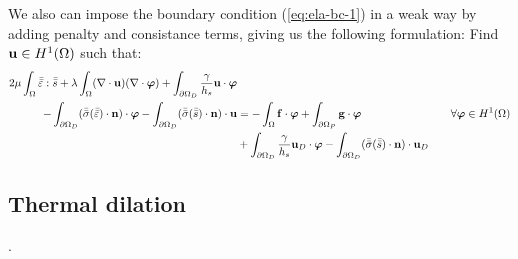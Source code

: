 We also can impose the boundary condition (\ref{eq:ela-bc-1}) in a weak way by
adding penalty and consistance terms, giving us the following formulation:
Find $\mathbf{u}\in H^1(\Omega)$ such that:
\begin{alignat}{2}
  2\mu \int_\Omega \bar{\bar{\varepsilon}}:\bar{\bar{s}}
  + \lambda \int_\Omega (\nabla\cdot\mathbf{u})(\nabla\cdot\bm{\varphi})
  + \int_{\partial \Omega_D} \frac{\gamma}{h_s} \mathbf{u} \cdot \bm{\varphi}
  &&& \nonumber \\
  - \int_{\partial \Omega_D}
  (\bar{\bar{\sigma}}(\bar{\bar{\varepsilon}}) \cdot \mathbf{n}) \cdot \bm{\varphi}
  - \int_{\partial \Omega_D} (\bar{\bar{\sigma}}(\bar{\bar{s}}) \cdot \mathbf{n}) \cdot \mathbf{u}
  &= - \int_\Omega \mathbf{f}\cdot\bm{\varphi}
  + \int_{\partial\Omega_P} \mathbf{g}\cdot\bm{\varphi}
  && \quad \forall \bm{\varphi}\in H^1(\Omega) \label{eq:ela-vf-weak} \\
  & + \int_{\partial \Omega_D} \frac{\gamma}{h_s} \mathbf{u}_D \cdot \bm{\varphi}
  - \int_{\partial \Omega_D} (\bar{\bar{\sigma}}(\bar{\bar{s}}) \cdot \mathbf{n}) \cdot \mathbf{u}_D
  \nonumber
\end{alignat}

\subsection{Thermal dilation}





.
